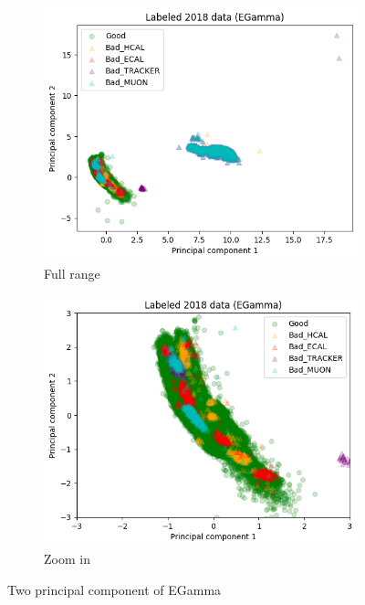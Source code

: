 \begin{figure}[h!]
\centering
    \begin{subfigure}[b]{0.49\linewidth}
        \includegraphics[width=\linewidth]{images/reco/2018/EGamma_subsystem_label.png}
        \caption{Full range}
    \end{subfigure}
    \begin{subfigure}[b]{0.49\linewidth}
        \includegraphics[width=\linewidth]{images/reco/2018/EGamma_subsystem_label_short_range.png}
        \caption{Zoom in}
    \end{subfigure}
\caption{Two principal component of EGamma}
\label{fig:2018_EGamma_subsystem_label}
\end{figure}

